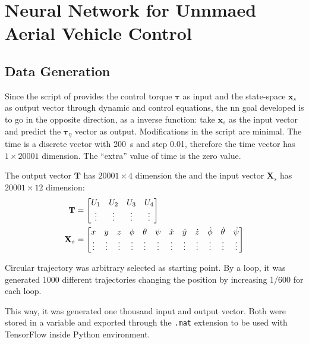 \section{Neural Network for Unnmaed Aerial Vehicle Control}

\subsection{Data Generation}

Since the script of \citet{geronel2023} provides the control torque \(\mathbf{\tau}\) as input and the state-space \(\mathbf{x}_s\) as output vector through dynamic and control equations, the \gls*{nn} goal developed is to go in the opposite direction, as a inverse function: take \(\mathbf{x}_s\) as the input vector and predict the \(\mathbf{\tau}_{\eta}\) vector as output.
Modifications in the script are minimal.
The time is a discrete vector with \SI{200}{s} and step 0.01, therefore the time vector has \(1\times 20001\) dimension.
The ``extra'' value of time is the zero value.

The output vector \(\mathbf{T}\) has \(20001\times 4\) dimension the and the input vector \(\mathbf{X}_s\) has  \(20001\times 12\) dimension:
%
\begin{align}
    \mathbf{T} &= \begin{bmatrix}
        U_1 & U_2 & U_3 & U_4 \\
        \vdots       & \vdots       & \vdots       & \vdots  \\
    \end{bmatrix} 
    \label{eq:tau_input} \\
    \setcounter{MaxMatrixCols}{13}
    \mathbf{X}_s &=
    \begin{bmatrix}
        x&y&z&\phi&\theta&\psi&\dot{x}&\dot{y}&\dot{z}&\dot{\phi}&\dot{\theta}&\dot{\psi} \\
        \vdots & \vdots & \vdots & \vdots & \vdots & \vdots & \vdots & \vdots & \vdots & \vdots & \vdots & \vdots 
    \end{bmatrix}
    \label{eq:xs_output}
\end{align}

Circular trajectory was arbitrary selected as starting point.
By a loop, it was generated 1000 different trajectories changing the position  by increasing 1/600  for each loop.

This way, it was generated one thousand input and output vector.
Both were stored in a \matlab variable and exported through the \texttt{.mat} extension to be used with TensorFlow inside Python environment.

